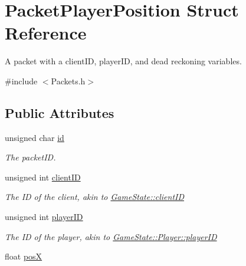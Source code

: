 \hypertarget{struct_packet_player_position}{\section{Packet\-Player\-Position Struct Reference}
\label{struct_packet_player_position}
}


A packet with a client\-I\-D, player\-I\-D, and dead reckoning variables.  




{\ttfamily \#include $<$Packets.\-h$>$}

\subsection*{Public Attributes}
\begin{DoxyCompactItemize}
\item 
\hypertarget{struct_packet_player_position_ad80364604ce3113e51136c2b0ca5d6e0}{unsigned char \hyperlink{struct_packet_player_position_ad80364604ce3113e51136c2b0ca5d6e0}{id}}\label{struct_packet_player_position_ad80364604ce3113e51136c2b0ca5d6e0}

\begin{DoxyCompactList}\small\item\em The packet\-I\-D. \end{DoxyCompactList}\item 
\hypertarget{struct_packet_player_position_a3647ac419f4e01afe948da2468b67658}{unsigned int \hyperlink{struct_packet_player_position_a3647ac419f4e01afe948da2468b67658}{client\-I\-D}}\label{struct_packet_player_position_a3647ac419f4e01afe948da2468b67658}

\begin{DoxyCompactList}\small\item\em The I\-D of the client, akin to \hyperlink{class_game_state_ad24a423ba6655fc6541b2f12ce98e0d0}{Game\-State\-::client\-I\-D} \end{DoxyCompactList}\item 
\hypertarget{struct_packet_player_position_a94c602eaa03f27c22937d37257368ab6}{unsigned int \hyperlink{struct_packet_player_position_a94c602eaa03f27c22937d37257368ab6}{player\-I\-D}}\label{struct_packet_player_position_a94c602eaa03f27c22937d37257368ab6}

\begin{DoxyCompactList}\small\item\em The I\-D of the player, akin to \hyperlink{class_game_state_1_1_player_acbd28d89e6eb8611aa66452ec31e9133}{Game\-State\-::\-Player\-::player\-I\-D} \end{DoxyCompactList}\item 
\hypertarget{struct_packet_player_position_a1719505fbc59c8f4948cfec4772859b0}{float \hyperlink{struct_packet_player_position_a1719505fbc59c8f4948cfec4772859b0}{pos\-X}}\label{struct_packet_player_position_a1719505fbc59c8f4948cfec4772859b0}


\end{DoxyCompactItemize}
